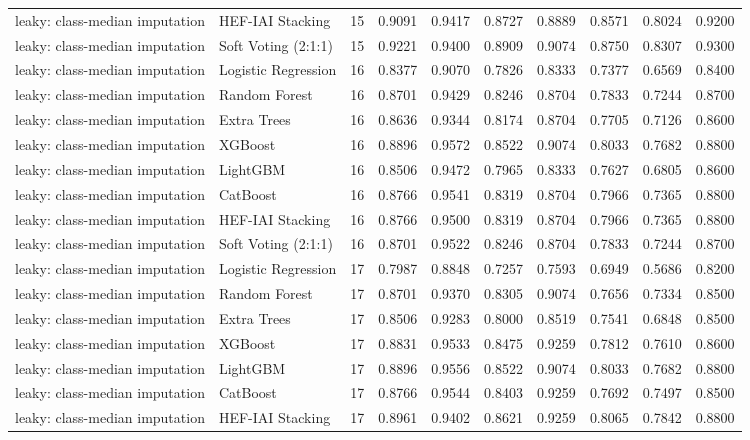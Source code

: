\begin{tabular}{llrrrrrrrr}
leaky: class-median imputation & HEF-IAI Stacking & 15 & 0.9091 & 0.9417 & 0.8727 & 0.8889 & 0.8571 & 0.8024 & 0.9200 \\
leaky: class-median imputation & Soft Voting (2:1:1) & 15 & 0.9221 & 0.9400 & 0.8909 & 0.9074 & 0.8750 & 0.8307 & 0.9300 \\
leaky: class-median imputation & Logistic Regression & 16 & 0.8377 & 0.9070 & 0.7826 & 0.8333 & 0.7377 & 0.6569 & 0.8400 \\
leaky: class-median imputation & Random Forest & 16 & 0.8701 & 0.9429 & 0.8246 & 0.8704 & 0.7833 & 0.7244 & 0.8700 \\
leaky: class-median imputation & Extra Trees & 16 & 0.8636 & 0.9344 & 0.8174 & 0.8704 & 0.7705 & 0.7126 & 0.8600 \\
leaky: class-median imputation & XGBoost & 16 & 0.8896 & 0.9572 & 0.8522 & 0.9074 & 0.8033 & 0.7682 & 0.8800 \\
leaky: class-median imputation & LightGBM & 16 & 0.8506 & 0.9472 & 0.7965 & 0.8333 & 0.7627 & 0.6805 & 0.8600 \\
leaky: class-median imputation & CatBoost & 16 & 0.8766 & 0.9541 & 0.8319 & 0.8704 & 0.7966 & 0.7365 & 0.8800 \\
leaky: class-median imputation & HEF-IAI Stacking & 16 & 0.8766 & 0.9500 & 0.8319 & 0.8704 & 0.7966 & 0.7365 & 0.8800 \\
leaky: class-median imputation & Soft Voting (2:1:1) & 16 & 0.8701 & 0.9522 & 0.8246 & 0.8704 & 0.7833 & 0.7244 & 0.8700 \\
leaky: class-median imputation & Logistic Regression & 17 & 0.7987 & 0.8848 & 0.7257 & 0.7593 & 0.6949 & 0.5686 & 0.8200 \\
leaky: class-median imputation & Random Forest & 17 & 0.8701 & 0.9370 & 0.8305 & 0.9074 & 0.7656 & 0.7334 & 0.8500 \\
leaky: class-median imputation & Extra Trees & 17 & 0.8506 & 0.9283 & 0.8000 & 0.8519 & 0.7541 & 0.6848 & 0.8500 \\
leaky: class-median imputation & XGBoost & 17 & 0.8831 & 0.9533 & 0.8475 & 0.9259 & 0.7812 & 0.7610 & 0.8600 \\
leaky: class-median imputation & LightGBM & 17 & 0.8896 & 0.9556 & 0.8522 & 0.9074 & 0.8033 & 0.7682 & 0.8800 \\
leaky: class-median imputation & CatBoost & 17 & 0.8766 & 0.9544 & 0.8403 & 0.9259 & 0.7692 & 0.7497 & 0.8500 \\
leaky: class-median imputation & HEF-IAI Stacking & 17 & 0.8961 & 0.9402 & 0.8621 & 0.9259 & 0.8065 & 0.7842 & 0.8800 \\

\end{tabular}
